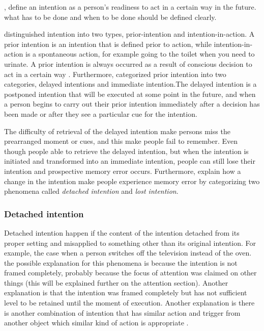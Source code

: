 \cite{LiaKvavilashviliAndJudiEllis}, \cite{gauld1977human} define an intention as a person's readiness to act in a certain way in the future. what has to be done and when to be done should be defined clearly.

\cite{searle1983intentionality} distinguished intention into two types, prior-intention and intention-in-action. A prior intention is an intention that is defined prior to action, while intention-in-action is a spontaneous action, for example going to the toilet when you need to urinate. A prior intention is always occurred as a result of conscious decision to act in a certain way \citep{Heckhausen1985-HECFWT}. Furthermore, \cite{gauld1977human} categorized prior intention into two categories, delayed intentions and immediate intention.The delayed intention is a postponed intention that will be executed at some point in the future, and when a person begins to carry out their prior intention immediately after a decision has been made or after they see a particular cue for the intention.


The difficulty of retrieval of the delayed intention make persons miss the prearranged moment or cues, and this make people fail to remember. Even though people able to retrieve the delayed intention, but when the intention is initiated and transformed into an immediate intention,  people can still lose their intention and prospective memory error occurs.
Furthermore, \cite{Reason1984} explain how a change in the intention make people experience memory error by categorizing two phenomena called \textit{detached intention} and \textit{lost intention}.

\subsubsection{Detached intention}

Detached intention happen if the content of the intention detached from its proper setting and misapplied to something other than its original intention. For example, the case when a person switches off the television instead of the oven. the possible explanation for this phenomena is because the intention is not framed completely, probably because the focus of attention was claimed on other things (this will be explained further on the attention section). Another explanation is that the intention was framed completely but has not sufficient level to be retained until the moment of execution. Another explanation is there is another combination of intention that has similar action and trigger from another object which similar kind of action is appropriate \citep{Reason1984}.


